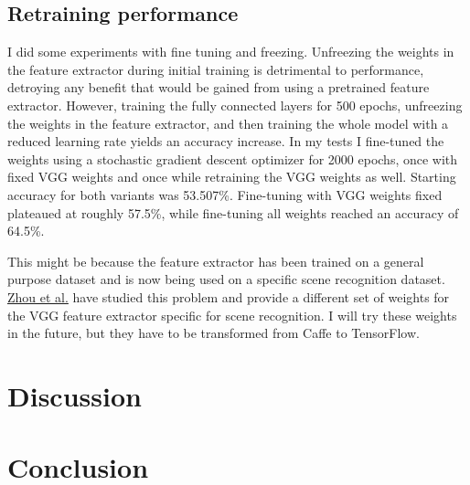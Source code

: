 \documentclass[11pt]{article}
\begin{document}
\subsection{Retraining performance}
I did some experiments with fine tuning and freezing.
Unfreezing the weights in the feature extractor during initial training is detrimental to performance, detroying any benefit that would be gained from using a pretrained feature extractor.
However, training the fully connected layers for 500 epochs, unfreezing the weights in the feature extractor, and then training the whole model with a reduced learning rate yields an accuracy increase.
In my tests I fine-tuned the weights using a stochastic gradient descent optimizer for 2000 epochs, once with fixed VGG weights and once while retraining the VGG weights as well.
Starting accuracy for both variants was 53.507\%.
Fine-tuning with VGG weights fixed plateaued at roughly 57.5\%, while fine-tuning all weights reached an accuracy of 64.5\%.

This might be because the feature extractor has been trained on a general purpose dataset and is now being used on a specific scene recognition dataset.
\href{related\_work/Zhou\%20et\%20al\_2014\_Learning\%20Deep\%20Features\%20for\%20Scene\%20Recognition\%20using\%20Places\%20Database.pdf}{Zhou et al.} have studied this problem and provide a different set of weights for the VGG feature extractor specific for scene recognition.
I will try these weights in the future, but they have to be transformed from Caffe to TensorFlow.

\section{Discussion}
\label{sec:discussion}

\section{Conclusion}
\label{sec:conclusion}



\end{document}
